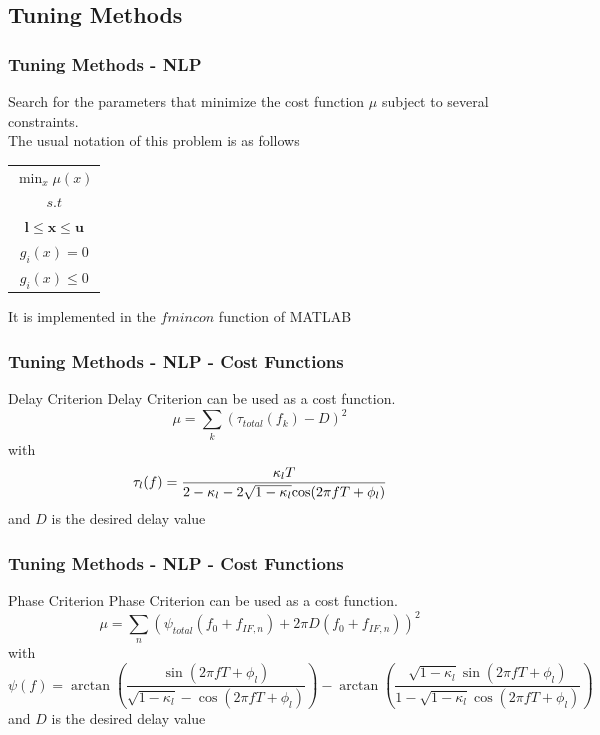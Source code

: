 \documentclass{beamer}
\begin{document}
\subsection{Tuning Methods}

\begin{frame}\frametitle{Tuning Methods - NLP}
	\begin{definition}
		Search for the parameters that minimize the cost function $\mu$ subject to several constraints.\\
		The usual notation of this problem is as follows\\
		\centering
		\begin{tabular}{c}
		
						$\min_{x}\mu(x)$\\
						$s.t$ \\
						$\textbf{l}\leqslant \textbf{x}\leqslant \textbf{u}$\\
						$g_i(x)=0$\\
						$g_i(x)\leqslant 0$\\
		\end{tabular}
	\end{definition}
	
	It is implemented in the $fmincon$ function of MATLAB
	
\end{frame}

\begin{frame}\frametitle{Tuning Methods - NLP - Cost Functions}
	\begin{block}{Delay Criterion}
	Delay Criterion can be used as a cost function.\\
	$$
	\mu = \sum_{k}(\tau_{total}(f_k)-D)^2
	$$
	with\\
	$$
	\tau_l(f)=\frac{\kappa_lT}{2-\kappa_l-2\sqrt{1-\kappa_l}\textup{cos}(2\pi fT+\phi _l)}
	$$
	and $D$ is the desired delay value
	\end{block}
\end{frame}

\begin{frame}\frametitle{Tuning Methods - NLP - Cost Functions}
	\begin{block}{Phase Criterion}
	Phase Criterion can be used as a cost function.\\
	
	$$
	\mu=\sum_{n}\left ( \psi _{total}(f_0+f_{IF,n}) +2\pi D(f_0+f_{IF,n})\right )^2
	$$
	with\\
	\scriptsize
	$$
	\psi (f)=\arctan\left ( \frac{\sin(2\pi fT+\phi_l)}{\sqrt{1-\kappa_l}-\cos(2\pi fT+\phi_l)}\right )-\arctan\left ( \frac{\sqrt{1-\kappa_l}\sin(2\pi fT+\phi_l)}{1-\sqrt{1-\kappa_l}\cos(2\pi fT+\phi_l)}\right )
	$$
	\normalsize 
	and $D$ is the desired delay value
	\end{block}
\end{frame}
\end{document}
